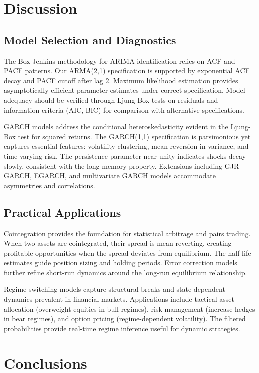 \documentclass[a4paper, 11pt]{article}
\begin{document}
\section{Discussion}

\subsection{Model Selection and Diagnostics}

The Box-Jenkins methodology for ARIMA identification relies on ACF and PACF patterns. Our
ARMA(2,1) specification is supported by exponential ACF decay and PACF cutoff after lag 2.
Maximum likelihood estimation provides asymptotically efficient parameter estimates under
correct specification. Model adequacy should be verified through Ljung-Box tests on residuals
and information criteria (AIC, BIC) for comparison with alternative specifications.

GARCH models address the conditional heteroskedasticity evident in the Ljung-Box test for
squared returns. The GARCH(1,1) specification is parsimonious yet captures essential features:
volatility clustering, mean reversion in variance, and time-varying risk. The persistence
parameter near unity indicates shocks decay slowly, consistent with the long memory property.
Extensions including GJR-GARCH, EGARCH, and multivariate GARCH models accommodate asymmetries
and correlations.

\subsection{Practical Applications}

Cointegration provides the foundation for statistical arbitrage and pairs trading. When two
assets are cointegrated, their spread is mean-reverting, creating profitable opportunities when
the spread deviates from equilibrium. The half-life estimates guide position sizing and holding
periods. Error correction models further refine short-run dynamics around the long-run
equilibrium relationship.

Regime-switching models capture structural breaks and state-dependent dynamics prevalent in
financial markets. Applications include tactical asset allocation (overweight equities in bull
regimes), risk management (increase hedges in bear regimes), and option pricing (regime-dependent
volatility). The filtered probabilities provide real-time regime inference useful for dynamic
strategies.

\section{Conclusions}
\end{document}
